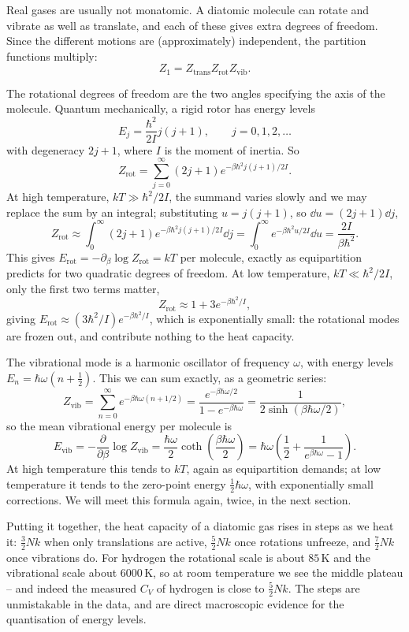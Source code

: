 Real gases are usually not monatomic. A diatomic molecule can rotate and vibrate as well as translate, and each of these gives extra degrees of freedom. Since the different motions are (approximately) independent, the partition functions multiply:
$$
Z_1 = Z_{\mathrm{trans}} Z_{\mathrm{rot}} Z_{\mathrm{vib}}.
$$

The rotational degrees of freedom are the two angles specifying the axis of the molecule. Quantum mechanically, a rigid rotor has energy levels
$$
E_j = \frac{\hbar^2}{2I}j(j+1), \qquad j = 0, 1, 2, \dots
$$
with degeneracy $2j+1$, where $I$ is the moment of inertia. So
$$
Z_{\mathrm{rot}} = \sum_{j=0}^\infty (2j+1)e^{-\beta \hbar^2 j(j+1)/2I}.
$$
At high temperature, $kT \gg \hbar^2/2I$, the summand varies slowly and we may replace the sum by an integral; substituting $u = j(j+1)$, so $\dd u = (2j+1)\dd j$,
$$
Z_{\mathrm{rot}} \approx \int_0^\infty (2j+1)e^{-\beta\hbar^2 j(j+1)/2I}\dd j = \int_0^\infty e^{-\beta\hbar^2 u/2I}\dd u = \frac{2I}{\beta\hbar^2}.
$$
This gives $E_{\mathrm{rot}} = -\partial_\beta \log Z_{\mathrm{rot}} = kT$ per molecule, exactly as equipartition predicts for two quadratic degrees of freedom. At low temperature, $kT \ll \hbar^2/2I$, only the first two terms matter,
$$
Z_{\mathrm{rot}} \approx 1 + 3e^{-\beta\hbar^2/I},
$$
giving $E_{\mathrm{rot}} \approx (3\hbar^2/I)e^{-\beta\hbar^2/I}$, which is exponentially small: the rotational modes are frozen out, and contribute nothing to the heat capacity.

The vibrational mode is a harmonic oscillator of frequency $\omega$, with energy levels $E_n = \hbar\omega(n + \tfrac 12)$. This we can sum exactly, as a geometric series:
$$
Z_{\mathrm{vib}} = \sum_{n=0}^\infty e^{-\beta \hbar\omega(n + 1/2)} = \frac{e^{-\beta\hbar\omega/2}}{1 - e^{-\beta\hbar\omega}} = \frac{1}{2\sinh(\beta\hbar\omega/2)},
$$
so the mean vibrational energy per molecule is
$$
E_{\mathrm{vib}} = -\frac{\partial}{\partial\beta}\log Z_{\mathrm{vib}} = \frac{\hbar\omega}{2}\coth\left(\frac{\beta\hbar\omega}{2}\right) = \hbar\omega\left(\frac{1}{2} + \frac{1}{e^{\beta\hbar\omega}-1}\right).
$$
At high temperature this tends to $kT$, again as equipartition demands; at low temperature it tends to the zero-point energy $\tfrac 12 \hbar\omega$, with exponentially small corrections. We will meet this formula again, twice, in the next section.

Putting it together, the heat capacity of a diatomic gas rises in steps as we heat it: $\tfrac 32 Nk$ when only translations are active, $\tfrac 52 Nk$ once rotations unfreeze, and $\tfrac 72 Nk$ once vibrations do. For hydrogen the rotational scale is about $85\,\mathrm{K}$ and the vibrational scale about $6000\,\mathrm{K}$, so at room temperature we see the middle plateau -- and indeed the measured $C_V$ of hydrogen is close to $\tfrac 52 Nk$. The steps are unmistakable in the data, and are direct macroscopic evidence for the quantisation of energy levels.


